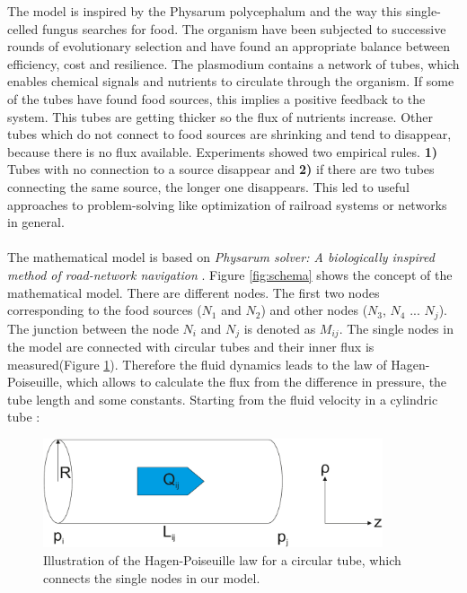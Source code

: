 \documentclass[11pt]{scrartcl}
\begin{document}
The model is inspired by the Physarum polycephalum and the way this single-celled fungus searches for food. The organism have been subjected to successive rounds of evolutionary selection and have found an appropriate balance between efficiency, cost and resilience. The plasmodium contains a network of tubes, which enables chemical signals and nutrients to circulate through the organism. If some of the tubes have found food sources, this implies a positive feedback to the system. This tubes are getting thicker so the flux of nutrients increase. Other tubes which do not connect to food sources are shrinking and tend to disappear, because there is no flux available. Experiments showed two empirical rules. \textbf{1)} Tubes with no connection to a source disappear and \textbf{2)} if there are two tubes connecting the same source, the longer one disappears. This led to useful approaches to problem-solving like optimization of railroad systems or networks in general.~\\
~\\
The mathematical model is based on \textit{Physarum solver: A biologically inspired method of road-network navigation} \cite{network_model}. Figure \ref{fig:schema} shows the concept of the mathematical model. There are different nodes. The first two nodes corresponding to the food sources ($N_1$ and $N_2$) and other nodes ($N_3$, $N_4$ ... $N_j$). The junction between the node $N_i$ and $N_j$ is denoted as $M_{ij}$. The single nodes in the model are connected with circular tubes and their inner flux is measured(Figure \ref{fig:fluidd}). Therefore the fluid dynamics leads to the law of Hagen-Poiseuille, which allows to calculate the flux from the difference in pressure, the tube length and some constants. Starting from the fluid velocity in a cylindric tube \cite{kirb2010}:
\begin{figure}[H]
	\centering
	\includegraphics[width=10cm]{figures/figure2}
	\caption{Illustration of the Hagen-Poiseuille law for a circular tube, which connects the single nodes in our model.}
	\label{fig:fluidd}
\end{figure}
\end{document}
